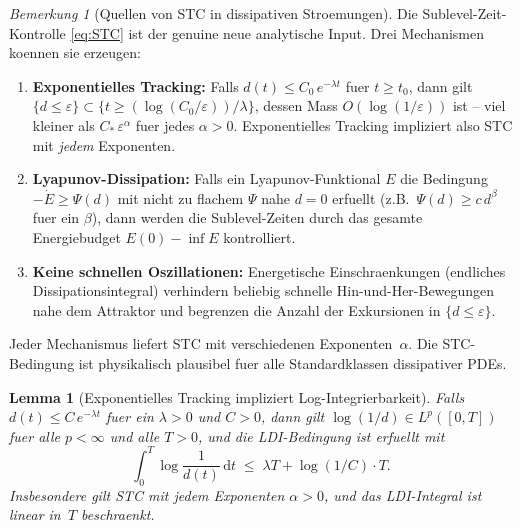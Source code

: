 \documentclass[12pt,a4paper]{article}
\theoremstyle{definition}
\theoremstyle{plain}
\newtheorem{lemma}[definition]{Lemma}
\theoremstyle{remark}
\newtheorem{remark}[definition]{Bemerkung}
\begin{document}
\begin{remark}[Quellen von STC in dissipativen Stroemungen]
\label{rem:STC-sources}
Die Sublevel-Zeit-Kontrolle \eqref{eq:STC} ist der genuine neue
analytische Input.  Drei Mechanismen koennen sie erzeugen:

\begin{enumerate}[label=(\roman*)]
  \item \textbf{Exponentielles Tracking:}\;
    Falls $d(t) \le C_0\,e^{-\lambda t}$ fuer $t \ge t_0$, dann gilt
    $\{d \le \varepsilon\} \subset
    \{t \ge (\log(C_0/\varepsilon))/\lambda\}$,
    dessen Mass $O(\log(1/\varepsilon))$ ist -- viel kleiner als
    $C_*\,\varepsilon^\alpha$ fuer jedes $\alpha > 0$.
    Exponentielles Tracking impliziert also STC mit \emph{jedem}
    Exponenten.
  \item \textbf{Lyapunov-Dissipation:}\;
    Falls ein Lyapunov-Funktional $E$ die Bedingung
    $-\dot{E} \ge \Psi(d)$ mit nicht zu flachem $\Psi$ nahe $d=0$
    erfuellt (z.B.\ $\Psi(d) \ge c\,d^\beta$ fuer ein $\beta$),
    dann werden die Sublevel-Zeiten durch das gesamte Energiebudget
    $E(0) - \inf E$ kontrolliert.
  \item \textbf{Keine schnellen Oszillationen:}\;
    Energetische Einschraenkungen (endliches Dissipationsintegral)
    verhindern beliebig schnelle Hin-und-Her-Bewegungen nahe dem
    Attraktor und begrenzen die Anzahl der Exkursionen in
    $\{d \le \varepsilon\}$.
\end{enumerate}
Jeder Mechanismus liefert STC mit verschiedenen Exponenten~$\alpha$.
Die STC-Bedingung ist physikalisch plausibel fuer alle
Standardklassen dissipativer PDEs.
\end{remark}

\begin{lemma}[Exponentielles Tracking impliziert Log-Integrierbarkeit]
\label{lem:stc-tracking}
Falls $d(t) \le C\,e^{-\lambda t}$ fuer ein $\lambda > 0$ und
$C > 0$, dann gilt $\log(1/d) \in L^p([0,T])$ fuer alle $p < \infty$
und alle $T > 0$, und die LDI-Bedingung ist erfuellt mit
\[
  \int_0^T \log\frac{1}{d(t)}\,\mathrm{d}t
  \;\le\;
  \lambda T + \log(1/C)\cdot T.
\]
Insbesondere gilt STC mit jedem Exponenten $\alpha > 0$, und
das LDI-Integral ist linear in~$T$ beschraenkt.
\end{lemma}
\end{document}
